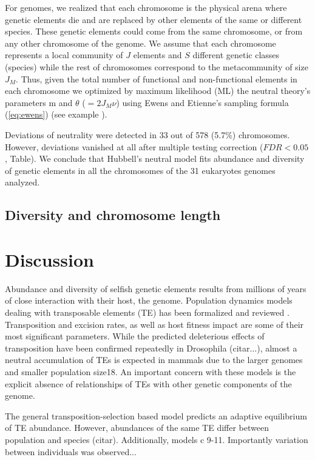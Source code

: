 For genomes, we realized that each chromosome is the physical arena where genetic elements die and are replaced by other elements of the same or different species. These genetic elements could come from the same chromosome, or from any other chromosome of the genome. We assume that each chromosome represents a local community of $J$ elements and $S$ different genetic classes (species) while the rest of chromosomes correspond to the metacommunity of size $J_M$. Thus, given the total number of functional and non-functional elements in each chromosome we optimized by maximum likelihood (ML) the neutral theory's parameters m and $\theta$ ($= 2 J_M\nu$) using Ewens and Etienne's sampling formula (\ref{eq:ewens}) (see example ).

Deviations of neutrality were detected in 33 out of 578 (5.7\%) chromosomes. However, deviations vanished at all after multiple testing correction ($FDR< 0.05$, Table). We conclude that Hubbell's neutral model fits abundance and diversity of genetic elements in all the chromosomes of the 31 eukaryotes genomes analyzed. 


\subsection{Diversity and chromosome length}

\section{Discussion}

Abundance and diversity of selfish genetic elements \cite{Doolittle1980,Orgel1980} results from millions of years of close interaction with their host, the genome. Population dynamics models dealing with transposable elements (TE) has been formalized and reviewed \cite{Charlesworth2009,Charlesworth1994,LeRouzic2005}. Transposition and excision rates, as well as host fitness impact are some of their most significant parameters. While the predicted deleterious effects of transposition have been confirmed repeatedly in Drosophila (citar...), almost a neutral accumulation of TEs is expected in mammals due to the larger genomes and smaller population size18. An important concern with these models is the explicit absence of relationships of TEs with other genetic components of the genome. 

The general transposition-selection based model predicts an adaptive equilibrium of TE abundance. However, abundances of the same TE differ between population and species (citar). 
Additionally, models c 9-11. Importantly variation between individuals was observed...\cite{Brookfield2005}


